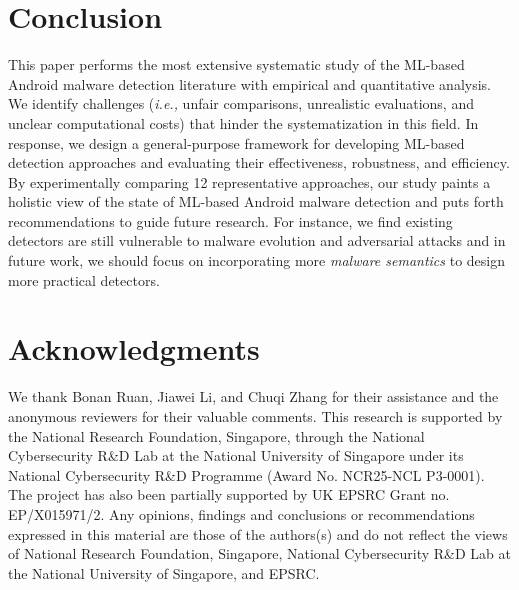 \section{Conclusion}
\label{sec:conclusion}
This paper performs the most extensive systematic study of the ML-based Android malware detection literature with empirical and quantitative analysis.
We identify challenges (\textit{i.e.,} unfair comparisons, unrealistic evaluations, and unclear computational costs) that hinder the systematization in this field.
In response, we design a general-purpose framework for developing ML-based detection approaches and evaluating their effectiveness, robustness, and efficiency.
By experimentally comparing 12 representative approaches, our study paints a holistic view of the state of ML-based Android malware detection and puts forth recommendations to guide future research.
For instance, we find existing detectors are still vulnerable to malware evolution and adversarial attacks and in future work, we should focus on incorporating more \textit{malware semantics} to design more practical detectors.

\section*{Acknowledgments}
We thank Bonan Ruan, Jiawei Li, and Chuqi Zhang for their assistance and the anonymous reviewers for their valuable comments.
This research is supported by the National Research Foundation, Singapore, through the National Cybersecurity R\&D Lab at the National University of Singapore under its National Cybersecurity R\&D Programme (Award No. NCR25-NCL P3-0001). The project has also been partially supported by UK EPSRC Grant no. EP/X015971/2. 
Any opinions, findings and conclusions or recommendations expressed in this material are those of the authors(s) and do not reflect the views of National Research Foundation, Singapore, National Cybersecurity R\&D Lab at the National University of Singapore, and EPSRC. 
